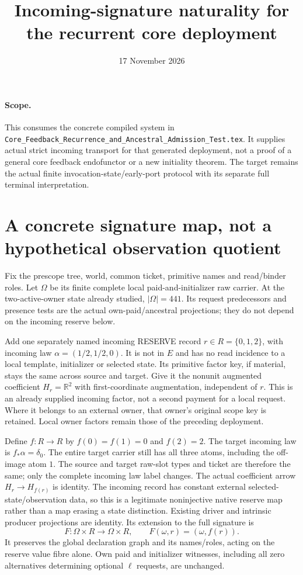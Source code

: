 \documentclass[11pt]{article}
\title{Incoming-signature naturality for the recurrent core deployment}
\date{17 November 2026}
\begin{document}
\maketitle
\paragraph{Scope.}
This consumes the concrete compiled system in \texttt{Core\_Feedback\_Recurrence\_and\_Ancestral\_Admission\_Test.tex}. It supplies actual strict incoming transport for that generated deployment, not a proof of a general core feedback endofunctor or a new initiality theorem. The target remains the actual finite invocation-state/early-port protocol with its separate full terminal interpretation.

\section{A concrete signature map, not a hypothetical observation quotient}
Fix the prescope tree, world, common ticket, primitive names and read/binder roles. Let $\Omega$ be its finite complete local paid-and-initializer raw carrier. At the two-active-owner state already studied, $|\Omega|=441$. Its request predecessors and presence tests are the actual own-paid/ancestral projections; they do not depend on the incoming reserve below.

Add one separately named incoming RESERVE record $r\in R=\{0,1,2\}$, with incoming law $\alpha=(1/2,1/2,0)$. It is not in $E$ and has no read incidence to a local template, initializer or selected state. Its primitive factor key, if material, stays the same across source and target. Give it the nonunit augmented coefficient $H_r=\mathbb R^2$ with first-coordinate augmentation, independent of $r$. This is an already supplied incoming factor, not a second payment for a local request. Where it belongs to an external owner, that owner's original scope key is retained. Local owner factors remain those of the preceding deployment.

Define $f:R\to R$ by $f(0)=f(1)=0$ and $f(2)=2$. The target incoming law is $f_*\alpha=\delta_0$. The entire target carrier still has all three atoms, including the off-image atom $1$. The source and target raw-slot types and ticket are therefore the same; only the complete incoming law label changes. The actual coefficient arrow $H_r\to H_{f(r)}$ is identity. The incoming record has constant external selected-state/observation data, so this is a legitimate noninjective native reserve map rather than a map erasing a state distinction. Existing driver and intrinsic producer projections are identity. Its extension to the full signature is
\[
               F:\Omega\times R\longrightarrow\Omega\times R,
                    \qquad F(\omega,r)=(\omega,f(r)).     \tag{1}
\]
It preserves the global declaration graph and its names/roles, acting on the reserve value fibre alone. Own paid and initializer witnesses, including all zero alternatives determining optional $\ell$ requests, are unchanged.
\end{document}
